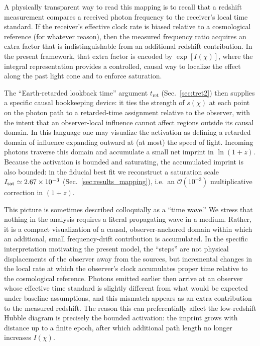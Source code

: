 \documentclass[10pt]{article}
\newcommand{\tret}{t_{\mathrm{ret}}}
\begin{document}
A physically transparent way to read this mapping is to recall that a redshift measurement compares
a received photon frequency to the receiver’s local time standard. If the receiver’s effective
clock rate is biased relative to a cosmological reference (for whatever reason), then the measured
frequency ratio acquires an extra factor that is indistinguishable from an additional redshift
contribution. In the present framework, that extra factor is encoded by $\exp[I(\chi)]$, where the
integral representation provides a controlled, causal way to localize the effect along the past
light cone and to enforce saturation.

The ``Earth-retarded lookback time'' argument $\tret$ (Sec.~\ref{sec:tret2}) then supplies a
specific causal bookkeeping device: it ties the strength of $s(\chi)$ at each point on the photon
path to a retarded-time assignment relative to the observer, with the intent that an observer-local
influence cannot affect regions outside its causal domain. In this language one may visualize the
activation as defining a retarded domain of influence expanding outward at (at most) the speed of
light. Incoming photons traverse this domain and accumulate a small net imprint in $\ln(1+z)$.
Because the activation is bounded and saturating, the accumulated imprint is also bounded: in the
fiducial best fit we reconstruct a saturation scale
$I_{\rm sat}\simeq 2.67\times 10^{-3}$ (Sec.~\ref{sec:results_mapping}), i.e.\ an
$\mathcal{O}(10^{-3})$ multiplicative correction in $(1+z)$.

This picture is sometimes described colloquially as a ``time wave.'' We stress that nothing in the
analysis requires a literal propagating wave in a medium. Rather, it is a compact visualization of
a causal, observer-anchored domain within which an additional, small frequency-drift contribution
is accumulated. In the specific interpretation motivating the present model, the ``steps'' are not
physical displacements of the observer away from the sources, but incremental changes in the local
rate at which the observer’s clock accumulates proper time relative to the cosmological reference.
Photons emitted earlier then arrive at an observer whose effective time standard is slightly
different from what would be expected under baseline assumptions, and this mismatch appears as an
extra contribution to the measured redshift. The reason this can preferentially affect the
low-redshift Hubble diagram is precisely the bounded activation: the imprint grows with distance up
to a finite epoch, after which additional path length no longer increases $I(\chi)$.
\end{document}
